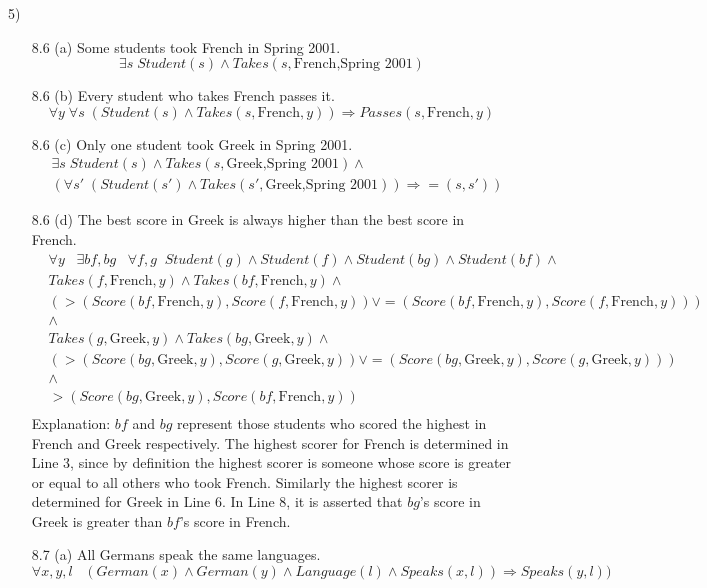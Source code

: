 \documentclass[11pt]{article}
\newcommand{\ra}{\Rightarrow}
\begin{document}
5)
	\begin{enumerate}
		\item[8.6 (a)] Some students took French in Spring 2001.
			\[ \exists s\; Student(s) \land Takes(s,\text{French,Spring 2001}) \]
		\item[8.6 (b)] Every student who takes French passes it.
			\[ \forall y\; \forall s\; (Student(s) \land Takes(s,\text{French},y)) \ra Passes(s,\text{French},y) \]
		\item[8.6 (c)] Only one student took Greek in Spring 2001.
			\begin{align*}
			 &\exists s\;  Student(s)  \land Takes(s ,\text{Greek,Spring 2001})  \land \\
			 &( \forall s'\; (Student(s') \land Takes(s',\text{Greek,Spring 2001})) \ra  =(s,s') )
			\end{align*}
		\item[8.6 (d)] The best score in Greek is always higher than the best score in French.
			\begin{align*}
			  &\forall y\;\;\;\exists bf,bg\;\;\;\forall f,g\;\;Student(g) \land Student(f) \land Student(bg) \land Student(bf) \land\\
				&Takes(f,\text{French},y) \land Takes(bf,\text{French},y) \land \\
				&( >( Score(bf,\text{French},y),Score(f,\text{French},y) )  \lor =( Score(bf,\text{French},y),Score(f,\text{French},y) ) ) \\
				&\land \\
				&Takes(g,\text{Greek},y) \land Takes(bg,\text{Greek},y) \land \\
				&( >( Score(bg,\text{Greek},y),Score(g,\text{Greek},y) )  \lor =( Score(bg,\text{Greek},y),Score(g,\text{Greek},y) ) ) \\
				&\land \\
				&>( Score(bg,\text{Greek},y), Score(bf,\text{French},y) ) \\
			\end{align*}
			Explanation: $bf$ and $bg$ represent those students who scored the highest in French and Greek respectively.
			The highest scorer for French is determined in Line 3, since by definition the highest scorer is someone whose
			score is greater or equal to all others who took French. Similarly the highest scorer is determined for Greek
			in Line 6. In Line 8, it is asserted that $bg$'s score in Greek is greater than $bf$'s score in French.
		\item[8.7 (a)] All Germans speak the same languages.
			\[ \forall x,y,l\;\;\;(German(x) \land German(y) \land Language(l) \land Speaks(x,l)) \ra Speaks(y,l)) \]
	\end{enumerate}
\end{document}
